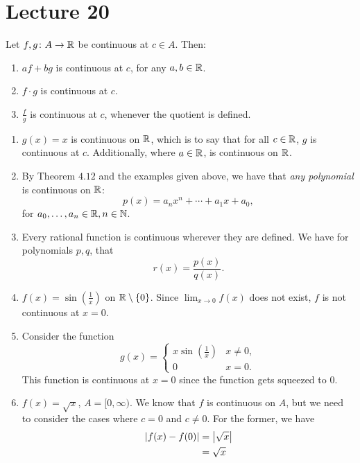 \documentclass[class=article, crop=false]{standalone}
\begin{document}
  \section{Lecture 20}
  \begin{theorem}{4.12}
    Let $f, g\colon A\to \mathbb{R}$ be continuous at $c\in A$. Then:
    \begin{enumerate}[label=(\roman*)]
      \item $af + bg$ is continuous at $c$, for any $a, b\in\mathbb{R}$.
      \item $f\cdot g$ is continuous at $c$.
      \item $\frac{f}{g}$ is continuous at $c$, whenever the quotient is defined.
    \end{enumerate}
  \end{theorem}
  \begin{example}{}
    \begin{enumerate}[label=\arabic*)]
      \item $g(x) = x$ is continuous on $\mathbb{R}$, which is to say that for all $c\in\mathbb{R}$, $g$ is continuous at $c$. Additionally, where $a\in\mathbb{R}$, is continuous on $\mathbb{R}$.
      \item By Theorem $4.12$ and the examples given above, we have that \emph{any polynomial} is continuous on $\mathbb{R}$:
      \[
        p(x) = a_nx^n + \dotsb + a_1x + a_0,
      \]
      for $a_0,\dotsc,a_n\in\mathbb{R}, n\in\mathbb{N}$.
      \item Every rational function is continuous wherever they are defined. We have for polynomials $p, q$, that
      \[
        r(x) = \frac{p(x)}{q(x)}.
      \]
      \item $f(x) = \sin (\frac{1}{x})$ on $\mathbb{R}\setminus\left\{0\right\}$. Since $\displaystyle\lim_{x\to 0} f(x)$ does not exist, $f$ is not continuous at $x = 0$.
      \item Consider the function
      \[
        g(x) = \begin{cases} x\sin (\frac{1}{x}) & x\neq 0, \\ 0 & x = 0. \end{cases}
      \]
      This function is continuous at $x = 0$ since the function gets squeezed to $0$.
      \item $f(x) = \sqrt{x}$, $A = [0, \infty)$. We know that $f$ is continuous on $A$, but we need to consider the cases where $c = 0$ and $c\neq 0$. For the former, we have
      \begin{align*}
        \abs{f(x) - f(0)} &= \abs{\sqrt{x}} \\
                          &= \sqrt{x} \\

\end{align*}
\end{enumerate}
\end{example}
\end{document}
